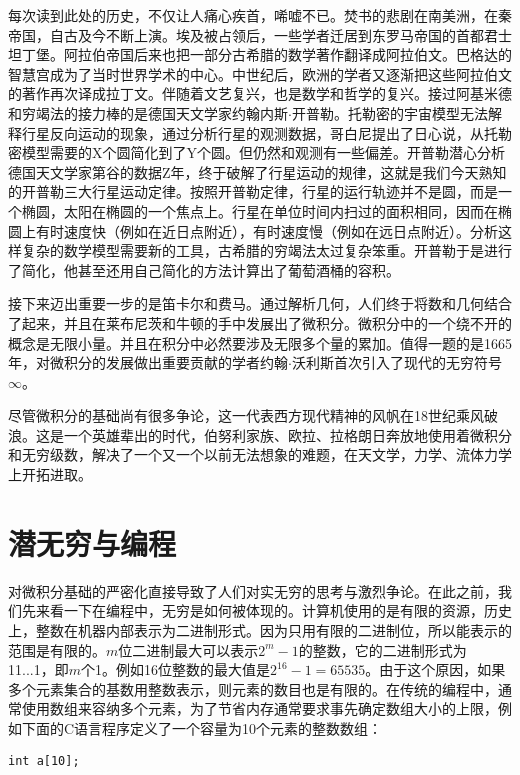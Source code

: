\documentclass{article}
\begin{document}
每次读到此处的历史，不仅让人痛心疾首，唏嘘不已。焚书的悲剧在南美洲，在秦帝国，自古及今不断上演。埃及被占领后，一些学者迁居到东罗马帝国的首都君士坦丁堡。阿拉伯帝国后来也把一部分古希腊的数学著作翻译成阿拉伯文。巴格达的智慧宫成为了当时世界学术的中心。中世纪后，欧洲的学者又逐渐把这些阿拉伯文的著作再次译成拉丁文。伴随着文艺复兴，也是数学和哲学的复兴。接过阿基米德和穷竭法的接力棒的是德国天文学家约翰内斯$\cdot$开普勒。托勒密的宇宙模型无法解释行星反向运动的现象，通过分析行星的观测数据，哥白尼提出了日心说，从托勒密模型需要的X个圆简化到了Y个圆。但仍然和观测有一些偏差。开普勒潜心分析德国天文学家第谷的数据Z年，终于破解了行星运动的规律，这就是我们今天熟知的开普勒三大行星运动定律。按照开普勒定律，行星的运行轨迹并不是圆，而是一个椭圆，太阳在椭圆的一个焦点上。行星在单位时间内扫过的面积相同，因而在椭圆上有时速度快（例如在近日点附近），有时速度慢（例如在远日点附近）。分析这样复杂的数学模型需要新的工具，古希腊的穷竭法太过复杂笨重。开普勒于是进行了简化，他甚至还用自己简化的方法计算出了葡萄酒桶的容积。

接下来迈出重要一步的是笛卡尔和费马。通过解析几何，人们终于将数和几何结合了起来，并且在莱布尼茨和牛顿的手中发展出了微积分。微积分中的一个绕不开的概念是无限小量。并且在积分中必然要涉及无限多个量的累加。值得一题的是1665年，对微积分的发展做出重要贡献的学者约翰$\cdot$沃利斯首次引入了现代的无穷符号$\infty$。

尽管微积分的基础尚有很多争论，这一代表西方现代精神的风帆在18世纪乘风破浪。这是一个英雄辈出的时代，伯努利家族、欧拉、拉格朗日奔放地使用着微积分和无穷级数，解决了一个又一个以前无法想象的难题，在天文学，力学、流体力学上开拓进取。

\section{潜无穷与编程}
对微积分基础的严密化直接导致了人们对实无穷的思考与激烈争论。在此之前，我们先来看一下在编程中，无穷是如何被体现的。计算机使用的是有限的资源，历史上，整数在机器内部表示为二进制形式。因为只用有限的二进制位，所以能表示的范围是有限的。$m$位二进制最大可以表示$2^m-1$的整数，它的二进制形式为11...1，即$m$个1。例如16位整数的最大值是$2^{16}-1 = 65535$。由于这个原因，如果多个元素集合的基数用整数表示，则元素的数目也是有限的。在传统的编程中，通常使用数组来容纳多个元素，为了节省内存通常要求事先确定数组大小的上限，例如下面的C语言程序定义了一个容量为10个元素的整数数组：

\begin{verbatim}
int a[10];
\end{verbatim}
\end{document}
